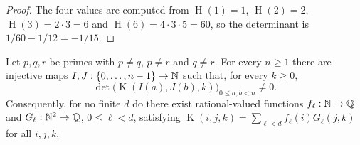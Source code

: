 \documentclass[11pt]{article}
\theoremstyle{remark}
\theoremstyle{plain}
\newcommand{\hgt}{\operatorname{H}}
\newcommand{\Kernel}{\operatorname{K}}
\begin{document}
\begin{proof}
The four values are computed from $\hgt(1)=1$, $\hgt(2)=2$,
$\hgt(3)=2\cdot3=6$ and $\hgt(6)=4\cdot3\cdot5=60$, so the determinant is
$1/60-1/12=-1/15$.
\end{proof}


\begin{theorem}\label{long269:res:infinite-rank}
\label{long269:res:lead-infinite-rank}
Let $p,q,r$ be primes with $p\ne q$, $p\ne r$ and $q\ne r$.  For every
$n\ge1$ there are injective maps $I,J:\{0,\ldots,n-1\}\to\mathbb{N}$ such that, for
every $k\ge0$,
\[
 \det\bigl(\Kernel(I(a),J(b),k)\bigr)_{0\le a,b<n}\ne0 .
\]
Consequently, for no finite $d$ do there exist rational-valued functions
$f_\ell:\mathbb{N}\to\mathbb{Q}$ and $G_\ell:\mathbb{N}^{2}\to\mathbb{Q}$, $0\le\ell<d$, satisfying
$\Kernel(i,j,k)=\sum_{\ell<d}f_\ell(i)G_\ell(j,k)$ for all $i,j,k$.
\end{theorem}
\end{document}
